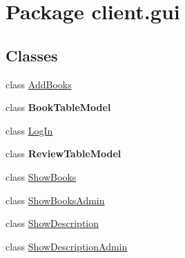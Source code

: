 \hypertarget{namespaceclient_1_1gui}{}\section{Package client.\+gui}
\label{namespaceclient_1_1gui}
\subsection*{Classes}
\begin{DoxyCompactItemize}
\item 
class \hyperlink{classclient_1_1gui_1_1_add_books}{Add\+Books}
\item 
class {\bfseries Book\+Table\+Model}
\item 
class \hyperlink{classclient_1_1gui_1_1_log_in}{Log\+In}
\item 
class {\bfseries Review\+Table\+Model}
\item 
class \hyperlink{classclient_1_1gui_1_1_show_books}{Show\+Books}
\item 
class \hyperlink{classclient_1_1gui_1_1_show_books_admin}{Show\+Books\+Admin}
\item 
class \hyperlink{classclient_1_1gui_1_1_show_description}{Show\+Description}
\item 
class \hyperlink{classclient_1_1gui_1_1_show_description_admin}{Show\+Description\+Admin}
\end{DoxyCompactItemize}
